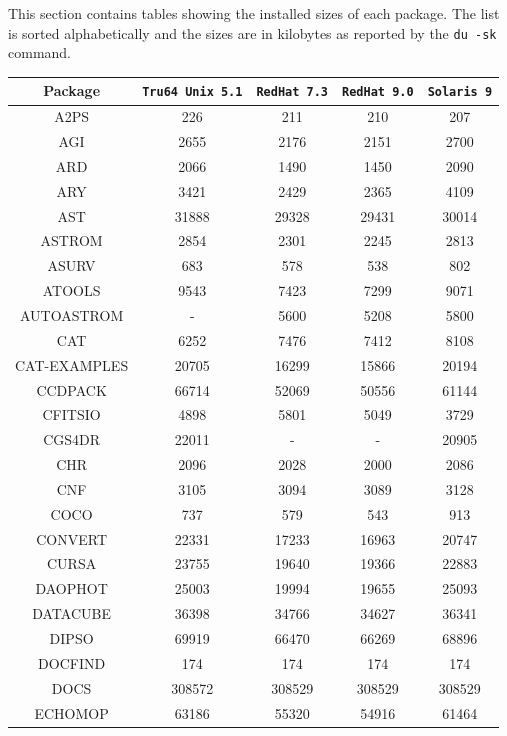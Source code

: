 \documentclass[twoside,11pt]{article}
\renewcommand{\_}{\texttt{\symbol{95}}}
\begin{document}
This section contains tables showing the installed sizes of each
package.  The list is sorted alphabetically and the sizes are in
kilobytes as reported by the \texttt{du -sk} command.

\vspace*{10mm}

\begin{table}[ht]
\begin{center}
\begin{tabular}{|c|c|c|c|c|}
\hline \hline
\textbf{Package} & \texttt{Tru64 Unix 5.1} & \texttt{RedHat 7.3} & \texttt{RedHat 9.0} & \texttt{Solaris 9} \\ \hline \hline
A2PS & 226 & 211 & 210 & 207 \\
AGI & 2655 & 2176 & 2151 & 2700 \\
ARD & 2066 & 1490 & 1450 & 2090 \\
ARY & 3421 & 2429 & 2365 & 4109 \\
AST & 31888 & 29328 & 29431 & 30014 \\
ASTROM & 2854 & 2301 & 2245 & 2813 \\
ASURV & 683 & 578 & 538 & 802 \\
ATOOLS & 9543 & 7423 & 7299 & 9071 \\
AUTOASTROM & - & 5600 & 5208 & 5800 \\
CAT & 6252 & 7476 & 7412 & 8108 \\
CAT-EXAMPLES & 20705 & 16299 & 15866 & 20194 \\
CCDPACK & 66714 & 52069 & 50556 & 61144 \\
CFITSIO & 4898 & 5801 & 5049 & 3729 \\
CGS4DR & 22011 & - & - & 20905 \\
CHR & 2096 & 2028 & 2000 & 2086 \\
CNF & 3105 & 3094 & 3089 & 3128 \\
COCO & 737 & 579 & 543 & 913 \\
CONVERT & 22331 & 17233 & 16963 & 20747 \\
CURSA & 23755 & 19640 & 19366 & 22883 \\
DAOPHOT & 25003 & 19994 & 19655 & 25093 \\
DATACUBE & 36398 & 34766 & 34627 & 36341 \\
DIPSO & 69919 & 66470 & 66269 & 68896 \\
DOCFIND & 174 & 174 & 174 & 174 \\
DOCS & 308572 & 308529 & 308529 & 308529 \\
ECHOMOP & 63186 & 55320 & 54916 & 61464 \\

\end{tabular}
\end{center}
\end{table}
\end{document}
